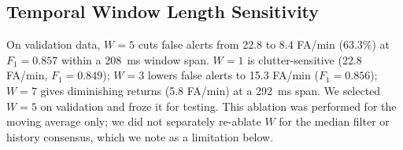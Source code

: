 \documentclass[conference]{IEEEtran}
\begin{document}
\begin{table}[!t]
\centering
\caption{Environment-Stratified Causal Decision Performance on Held-Out Test Split (8 Tiles per Biome, 5,570 Total Frames)}
\label{tab:per_biome_benchmark}
\end{table}

\subsection{Temporal Window Length Sensitivity}
On validation data, $W=5$ cuts false alerts from 22.8 to 8.4 FA/min (63.3\%) at $F_1=0.857$ within a 208~ms window span. $W=1$ is clutter-sensitive (22.8 FA/min, $F_1=0.849$); $W=3$ lowers false alerts to 15.3 FA/min ($F_1=0.856$); $W=7$ gives diminishing returns (5.8 FA/min) at a 292~ms span. We selected $W=5$ on validation and froze it for testing. This ablation was performed for the moving average only; we did not separately re-ablate $W$ for the median filter or history consensus, which we note as a limitation below.
\end{document}
